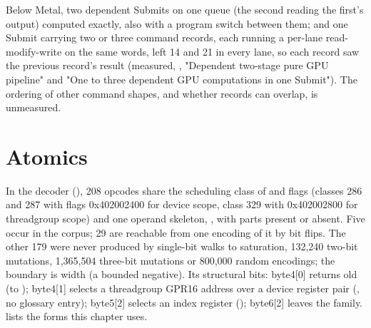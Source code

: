 Below Metal, two dependent Submits on one queue (the second reading the first's output) computed exactly, also with a
program switch between them; and one Submit carrying two or three command records, each running a per-lane 
read-modify-write on the same words, left 14 and 21 in every lane, so each record saw the previous record's result
(measured, , "Dependent two-stage pure GPU pipeline" and "One to three dependent GPU
computations in one Submit"). The ordering of other command shapes, and whether records can overlap, is unmeasured.

\section{Atomics}\label{sec:atomics}

In the decoder (), 208 opcodes share the scheduling class of  and flags
(classes 286 and 287 with flags 0x402002400 for device scope, class 329 with 0x402002800 for threadgroup scope) and one
operand skeleton, , with parts present or absent. Five occur
in the corpus; 29 are reachable from one encoding of it by bit flips. The other 179 were never produced by single-bit
walks to saturation, 132,240 two-bit mutations, 1,365,504 three-bit mutations or 800,000 random encodings; the boundary is
width (a bounded negative). Its structural bits: byte4{[}0{]} returns old (to ); byte4{[}1{]} selects a threadgroup GPR16 address over a device register pair (, no glossary entry);
byte5{[}2{]} selects an index register (); byte6{[}2{]} leaves the family.
 lists the forms this chapter uses.


